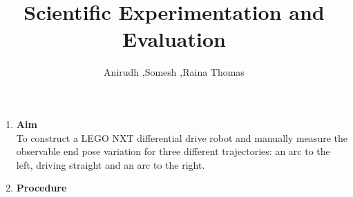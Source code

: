 \documentclass[10pt,a4paper]{article}
\author{Anirudh ,Somesh ,Raina Thomas}
\title{
	\textbf{Scientific Experimentation and Evaluation}
	}
\begin{document}
	
\begin{titlepage}

	\maketitle
	
\end{titlepage}
\Large
\begin{enumerate}[label=\Roman*]
\item
\vspace{0.5cm}
\Large{\textbf{Aim}}\\

To construct a LEGO NXT differential drive robot and manually measure the observable  end pose variation for three different trajectories: an arc to the left, driving straight and an arc to the right.
\vspace{0.5cm}
\item
\Large{\textbf{Procedure}}\\


\end{enumerate}
\end{document}
